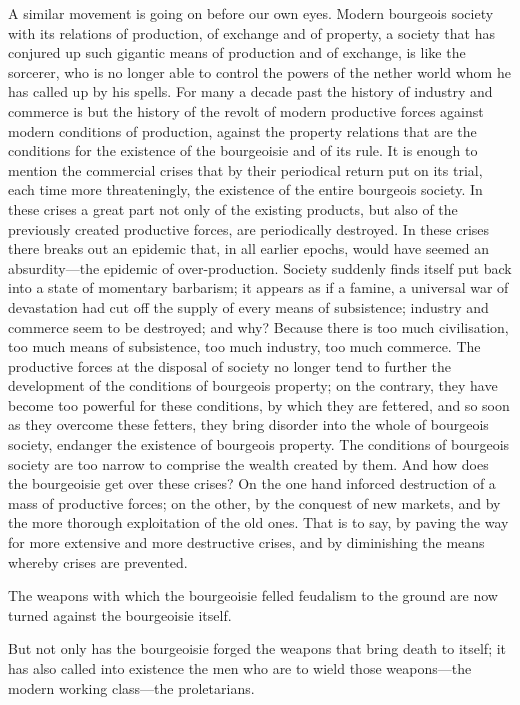 A similar movement is going on before our own eyes. Modern bourgeois
society with its relations of production, of exchange and of property,
a society that has conjured up such gigantic means of production and of
exchange, is like the sorcerer, who is no longer able to control the
powers of the nether world whom he has called up by his spells. For
many a decade past the history of industry and commerce is but the
history of the revolt of modern productive forces against modern
conditions of production, against the property relations that are the
conditions for the existence of the bourgeoisie and of its rule. It is
enough to mention the commercial crises that by their periodical return
put on its trial, each time more threateningly, the existence of the
entire bourgeois society. In these crises a great part not only of the
existing products, but also of the previously created productive
forces, are periodically destroyed. In these crises there breaks out an
epidemic that, in all earlier epochs, would have seemed an
absurdity—the epidemic of over-production. Society suddenly finds
itself put back into a state of momentary barbarism; it appears as if a
famine, a universal war of devastation had cut off the supply of every
means of subsistence; industry and commerce seem to be destroyed; and
why? Because there is too much civilisation, too much means of
subsistence, too much industry, too much commerce. The productive
forces at the disposal of society no longer tend to further the
development of the conditions of bourgeois property; on the contrary,
they have become too powerful for these conditions, by which they are
fettered, and so soon as they overcome these fetters, they bring
disorder into the whole of bourgeois society, endanger the existence of
bourgeois property. The conditions of bourgeois society are too narrow
to comprise the wealth created by them. And how does the bourgeoisie
get over these crises? On the one hand inforced destruction of a mass
of productive forces; on the other, by the conquest of new markets, and
by the more thorough exploitation of the old ones. That is to say, by
paving the way for more extensive and more destructive crises, and by
diminishing the means whereby crises are prevented.

The weapons with which the bourgeoisie felled feudalism to the ground
are now turned against the bourgeoisie itself.

But not only has the bourgeoisie forged the weapons that bring death to
itself; it has also called into existence the men who are to wield
those weapons—the modern working class—the proletarians.

